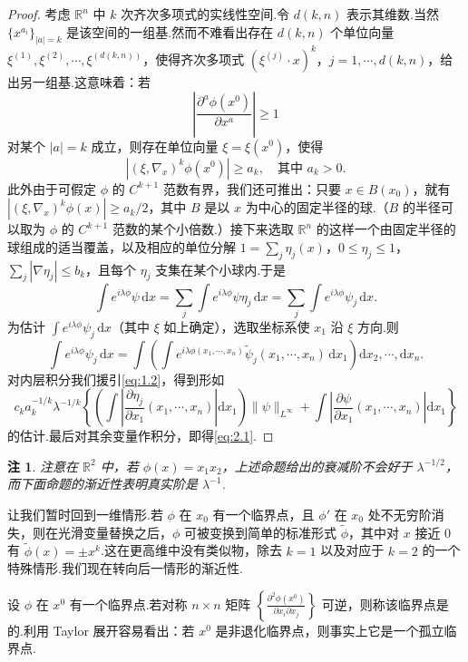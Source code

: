 \documentclass[
  BookTitleCN={傅里叶分析中的振动积分},
  BookTitleEN={Oscillatory Integrals in Fourier Analysis},
  OriginalAuthor={E.~M. Stein},
  OriginalEdition={Proc. Sympos. Pure Math. 35, Part~1},
  OriginalPublisher={American Mathematical Society},
  OriginalYear={1979},
  Translator={翻译及重排},
  ModelUsed={Codex CLI},
  Biblatex=false,
  TranslationDate={2026年8月27日}
]{mathtranslation}
\numberwithin{equation}{chapter}   %
\newtheorem*{remark*}{注}
\newcommand{\R}{\mathbb{R}}
\begin{document}
\begin{proof}
  考虑 $\R^n$ 中 $k$ 次齐次多项式的实线性空间.令 $d(k,n)$ 表示其维数.当然 $\{x^{a_i}\}_{|a|=k}$ 是该空间的一组基.然而不难看出存在 $d(k,n)$ 个单位向量 $\xi^{(1)},\xi^{(2)},\cdots,\xi^{(d(k,n))}$，使得齐次多项式 $(\xi^{(j)}\cdot x)^{k}$，$j=1,\cdots,d(k,n)$，给出另一组基.这意味着：若
  \[
    \left|\frac{\partial^{a}\phi(x^{0})}{\partial x^{a}}\right|\geq1
  \]
  对某个 $|a|=k$ 成立，则存在单位向量 $\xi=\xi(x^{0})$，使得
  \[
    \left|(\xi,\nabla_{x})^{k}\phi(x^{0})\right|\geq a_{k},\quad\text{其中 }a_{k}>0 .
  \]
  此外由于可假定 $\phi$ 的 $C^{k+1}$ 范数有界，我们还可推出：只要 $x\in B(x_0)$，就有 $|(\xi,\nabla_x)^{k}\phi(x)|\geq a_{k}/2$，其中 $B$ 是以 $x$ 为中心的固定半径的球.（$B$ 的半径可以取为 $\phi$ 的 $C^{k+1}$ 范数的某个小倍数.）接下来选取 $\R^n$ 的这样一个由固定半径的球组成的适当覆盖，以及相应的单位分解 $1=\sum_{j}\eta_{j}(x)$，$0\leq\eta_{j}\leq1$，$\sum_{j}|\nabla\eta_{j}|\leq b_{k}$，且每个 $\eta_{j}$ 支集在某个小球内.于是
  \[
    \int e^{i\lambda\phi}\psi\,\mathrm{d}x = \sum_{j}\int e^{i\lambda\phi}\psi\eta_{j}\,\mathrm{d}x = \sum_{j}\int e^{i\lambda\phi}\psi_{j}\,\mathrm{d}x .
  \]
  为估计 $\int e^{i\lambda\phi}\psi_{j}\,\mathrm{d}x$（其中 $\xi$ 如上确定），选取坐标系使 $x_1$ 沿 $\xi$ 方向.则
  \[
    \int e^{i\lambda\phi}\psi_{j}\,\mathrm{d}x = \int\left(\int e^{i\lambda\phi(x_1,\cdots,x_n)}\tilde\psi_{j}(x_1,\cdots,x_n)\,\mathrm{d}x_1\right)\mathrm{d}x_2,\cdots,\mathrm{d}x_n .
  \]
  对内层积分我们援引\eqref{eq:1.2}，得到形如
  \[
    c_{k}a_{k}^{-1/k}\lambda^{-1/k}\left\{\left(\int\left|\frac{\partial\eta_{j}}{\partial x_1}(x_1,\cdots,x_n)\right|\mathrm{d}x_1\right)\|\psi\|_{L^\infty}+\int\left|\frac{\partial\psi}{\partial x_1}(x_1,\cdots,x_n)\right|\mathrm{d}x_1\right\}
  \]
  的估计.最后对其余变量作积分，即得\eqref{eq:2.1}.
\end{proof}

\begin{remark*}
  注意在 $\R^{2}$ 中，若 $\phi(x)=x_1x_2$，上述命题给出的衰减阶不会好于 $\lambda^{-1/2}$，而下面命题的渐近性表明真实阶是 $\lambda^{-1}$.
\end{remark*}

\noindent 让我们暂时回到一维情形.若 $\phi$ 在 $x_0$ 有一个临界点，且 $\phi'$ 在 $x_0$ 处不无穷阶消失，则在光滑变量替换之后，$\phi$ 可被变换到简单的标准形式 $\tilde\phi$，其中对 $x$ 接近 $0$ 有 $\tilde\phi(x)=\pm x^{k}$.这在更高维中没有类似物，除去 $k=1$ 以及对应于 $k=2$ 的一个特殊情形.我们现在转向后一情形的渐近性.

\noindent 设 $\phi$ 在 $x^{0}$ 有一个临界点.若对称 $n\times n$ 矩阵 $\left\{\frac{\partial^{2}\phi(x^{0})}{\partial x_i\partial x_j}\right\}$ 可逆，则称该临界点是的.利用 Taylor 展开容易看出：若 $x^{0}$ 是非退化临界点，则事实上它是一个孤立临界点.
\end{document}
